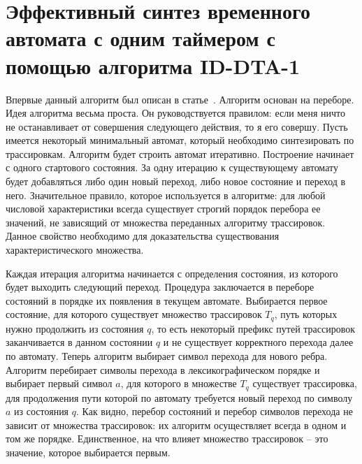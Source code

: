 \documentclass[times,specification,annotation]{itmo-student-thesis}
\begin{document}
\section{Эффективный синтез временного автомата с одним таймером с помощью алгоритма ID-DTA-1}

Впервые данный алгоритм был описан в статье~\cite{1-dta}. Алгоритм основан на переборе. Идея алгоритма весьма проста.
Он руководствуется правилом: если меня ничто не останавливает от совершения следующего действия, то я его совершу. 
Пусть имеется некоторый минимальный автомат, который необходимо синтезировать по трассировкам. 
Алгоритм будет строить автомат итеративно. Построение начинает с одного стартового состояния. 
За одну итерацию к существующему автомату будет добавляться либо один новый переход, либо новое состояние и переход в него.
Значительное правило, которое используется в алгоритме: для любой числовой характеристики всегда существует строгий порядок перебора ее значений,
не зависящий от множества переданных алгоритму трассировок. Данное свойство необходимо для доказательства существования характеристического множества.

Каждая итерация алгоритма начинается с определения состояния, из которого будет выходить следующий переход. Процедура заключается в переборе состояний в порядке их появления в текущем автомате.
Выбирается первое состояние, для которого существует множество трассировок $T_q$, путь которых нужно продолжить из состояния $q$, то есть некоторый префикс путей трассировок
заканчивается в данном состоянии $q$ и не существует корректного перехода
далее по автомату. Теперь алгоритм выбирает символ перехода для нового ребра. Алгоритм перебирает символы перехода в лексикографическом порядке и выбирает первый символ $a$, для которого
в множестве $T_q$ существует трассировка, для продолжения пути которой по автомату требуется новый переход по символу $a$ из состояния $q$. Как видно, перебор состояний и перебор
символов перехода не зависит от множества трассировок: их алгоритм осуществляет всегда в одном и том же порядке. Единственное, на что влияет множество трассировок -- это значение, которое выбирается
первым. 
\end{document}
